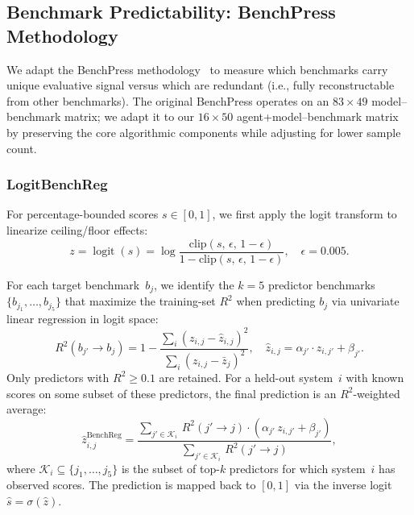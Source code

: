 
\subsection{Benchmark Predictability: BenchPress Methodology}
\label{app:benchpress}

We adapt the BenchPress methodology~\cite{benchpress2025} to measure which
benchmarks carry unique evaluative signal versus which are redundant (i.e.,
fully reconstructable from other benchmarks).  The original BenchPress
operates on an $83 \times 49$ model--benchmark matrix; we adapt it to our
$16 \times 50$ agent+model--benchmark matrix by preserving the core algorithmic
components while adjusting for lower sample count.

\subsubsection{LogitBenchReg}
\label{app:logit-benchreg}

For percentage-bounded scores $s \in [0,1]$, we first apply the logit
transform to linearize ceiling/floor effects:
\begin{equation}
  z = \operatorname{logit}(s) = \log\!\frac{\,\mathrm{clip}(s,\,\epsilon,\,1{-}\epsilon)\,}
       {1 - \mathrm{clip}(s,\,\epsilon,\,1{-}\epsilon)},
  \quad \epsilon = 0.005.
  \label{eq:logit-transform}
\end{equation}

For each target benchmark~$b_j$, we identify the $k{=}5$ predictor benchmarks
$\{b_{j_1}, \ldots, b_{j_5}\}$ that maximize the training-set $R^2$ when
predicting $b_j$ via univariate linear regression in logit space:
\begin{equation}
  R^2(b_{j'} \to b_j)
  = 1 - \frac{\sum_i (z_{i,j} - \hat{z}_{i,j})^2}{\sum_i (z_{i,j} - \bar{z}_j)^2},
  \quad
  \hat{z}_{i,j} = \alpha_{j'} \cdot z_{i,j'} + \beta_{j'}.
  \label{eq:benchreg-r2}
\end{equation}
Only predictors with $R^2 \ge 0.1$ are retained.  For a held-out system~$i$
with known scores on some subset of these predictors, the final prediction is
an $R^2$-weighted average:
\begin{equation}
  \hat{z}_{i,j}^{\mathrm{BenchReg}}
  = \frac{\sum_{j' \in \mathcal{K}_i}\, R^2(j' \!\to\! j) \cdot (\alpha_{j'}\, z_{i,j'} + \beta_{j'})}
         {\sum_{j' \in \mathcal{K}_i}\, R^2(j' \!\to\! j)},
  \label{eq:benchreg-pred}
\end{equation}
where $\mathcal{K}_i \subseteq \{j_1,\ldots,j_5\}$ is the subset of top-$k$
predictors for which system~$i$ has observed scores.  The prediction is mapped
back to $[0,1]$ via the inverse logit $\hat{s} = \sigma(\hat{z})$.

